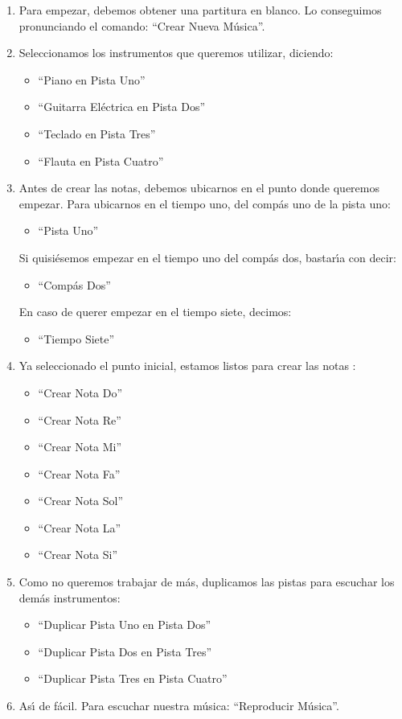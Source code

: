 \begin{enumerate}
  \item Para empezar, debemos obtener una partitura en blanco. Lo conseguimos pronunciando el comando: 
  ``Crear Nueva M\'usica''.

  \item Seleccionamos los instrumentos que queremos utilizar, diciendo:
    \begin{itemize}
      \item ``Piano en Pista Uno''
      \item ``Guitarra El\'ectrica en Pista Dos''
      \item ``Teclado en Pista Tres''
      \item ``Flauta en Pista Cuatro''
    \end{itemize}

  \item Antes de crear las notas, debemos ubicarnos en el punto donde queremos empezar.
  Para ubicarnos en el tiempo uno, del comp\'as uno de la pista uno:
  \begin{itemize}
    \item ``Pista Uno''
  \end{itemize}
        Si quisi\'esemos empezar en el tiempo uno del comp\'as dos, bastar{\'\i}a con decir:
  \begin{itemize}
    \item ``Comp\'as Dos''
  \end{itemize}
        En caso de querer empezar en el tiempo siete, decimos:
  \begin{itemize}
    \item ``Tiempo Siete''
  \end{itemize}

  \item Ya seleccionado el punto inicial, estamos listos para crear las notas :
  \begin{itemize}
    \item ``Crear Nota Do''
    \item ``Crear Nota Re''
    \item ``Crear Nota Mi''
    \item ``Crear Nota Fa''
    \item ``Crear Nota Sol''
    \item ``Crear Nota La''
    \item ``Crear Nota Si''
  \end{itemize}


  \item Como no queremos trabajar de m\'as, duplicamos las pistas para escuchar los dem\'as instrumentos:
  \begin{itemize}
    \item ``Duplicar Pista Uno en Pista Dos''
    \item ``Duplicar Pista Dos en Pista Tres''
    \item ``Duplicar Pista Tres en Pista Cuatro''
  \end{itemize}

  \item As{\'\i} de f\'acil. Para escuchar nuestra m\'usica: ``Reproducir M\'usica''.

\end{enumerate}

